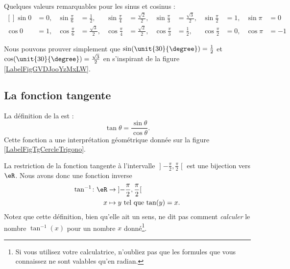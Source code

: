 Quelques valeurs remarquables pour les sinus et cosinus :
\begin{equation}
	\begin{aligned}[]
		\sin 0&=0,&\sin\frac{ \pi }{ 6 }&=\frac{ 1 }{2},&\sin\frac{ \pi }{ 4 }&=\frac{ \sqrt{2} }{2},&\sin\frac{ \pi }{ 3 }&=\frac{ \sqrt{3} }{2},&\sin\frac{ \pi }{2}&=1,&\sin\pi&=0\\
		\cos 0&=1,&\cos\frac{ \pi }{ 6 }&=\frac{ \sqrt{3} }{2},&\cos\frac{ \pi }{ 4 }&=\frac{ \sqrt{2} }{2},&\cos\frac{ \pi }{ 3 }&=\frac{ 1 }{2},&\cos\frac{ \pi }{2}&=0,&\cos\pi&=-1
	\end{aligned}
\end{equation}

Nous pouvons prouver simplement que $\sin(\unit{30}{\degree})=\frac{ 1 }{2}$ et $\cos(\unit{30}{\degree})=\frac{ \sqrt{3} }{2}$ en s'inspirant de la figure \ref{LabelFigGVDJooYzMxLW}. %
\newcommand{\CaptionFigGVDJooYzMxLW}{Un triangle équilatéral de côté $1$.}


\subsection{La fonction tangente}

La définition de la  est :
\begin{equation}
	\tan\theta=\frac{ \sin\theta }{ \cos\theta }.
\end{equation}
Cette fonction a une interprétation géométrique donnée sur la figure \ref{LabelFigTgCercleTrigono}.
\newcommand{\CaptionFigTgCercleTrigono}{Interprétation géométrique de la fonction tangente. La tangente de l'angle $\theta$ est positive (et un peu plus grande que $1$) tandis que celle de la tangente de l'angle $\varphi$ est négative.}


La restriction de la fonction tangente à l'intervalle $\mathopen] -\frac{ \pi }{2} , \frac{ \pi }{2} \mathclose[$ est une bijection vers $\eR$. Nous avons donc une fonction inverse
\begin{equation}
	\begin{aligned}
		\tan^{-1}\colon \eR&\to \mathopen] -\frac{ \pi }{2} , \frac{ \pi }{2} \mathclose[ \\
		x&\mapsto \text{$y$ tel que $\tan(y)=x$.}
	\end{aligned}
\end{equation}
Notez que cette définition, bien qu'elle ait un sens, ne dit pas comment \emph{calculer} le nombre $\tan^{-1}(x)$ pour un nombre $x$ donné\footnote{Si vous utilisez votre calculatrice, n'oubliez pas que les formules que vous connaissez ne sont valables qu'en radian.}.

